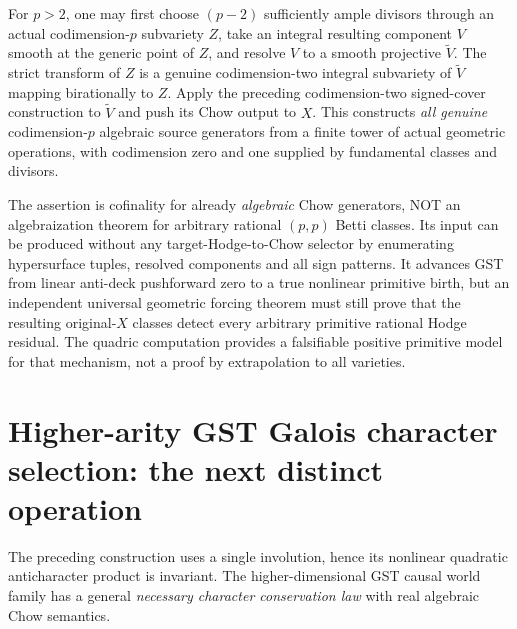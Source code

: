 \documentclass[11pt]{article}
\begin{document}
For $p>2$, one may first choose $(p-2)$ sufficiently ample
divisors through an actual codimension-$p$ subvariety $Z$,
take an integral resulting component $V$ smooth at the
generic point of $Z$, and resolve $V$ to a smooth projective
$\widetilde V$. The strict transform of $Z$ is a genuine
codimension-two integral subvariety of $\widetilde V$ mapping
birationally to $Z$. Apply the preceding codimension-two
signed-cover construction to $\widetilde V$ and push its
Chow output to $X$. This constructs \emph{all genuine}
codimension-$p$ algebraic source generators from a
finite tower of actual geometric operations, with
codimension zero and one supplied by fundamental classes
and divisors.

The assertion is cofinality for already \emph{algebraic}
Chow generators, NOT an algebraization theorem for arbitrary
rational $(p,p)$ Betti classes. Its input can be produced
without any target-Hodge-to-Chow selector by enumerating
hypersurface tuples, resolved components and all sign
patterns. It advances GST from linear anti-deck
pushforward zero to a true nonlinear primitive birth,
but an independent universal geometric forcing theorem
must still prove that the resulting original-$X$
classes detect every arbitrary primitive rational Hodge
residual. The quadric computation provides a falsifiable
positive primitive model for that mechanism, not a
proof by extrapolation to all varieties.


\section{Higher-arity GST Galois character selection: the next distinct operation}
The preceding construction uses a single involution, hence its
nonlinear quadratic anticharacter product is invariant. The
higher-dimensional GST causal world family has a general
\emph{necessary character conservation law} with real
algebraic Chow semantics.
\end{document}
